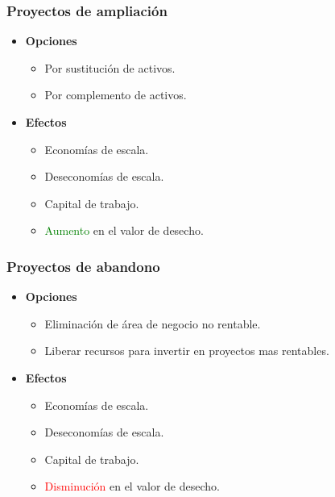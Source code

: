 \documentclass{templateNote}
\begin{document}
\subsubsection*{Proyectos de ampliación}

\begin{itemize}
    \item \textbf{Opciones}
    \begin{itemize}
        \item Por sustitución de activos.
        \item Por complemento de activos.
    \end{itemize}
    \item \textbf{Efectos}
    \begin{itemize}
        \item Economías de escala.
        \item Deseconomías de escala.
        \item Capital de trabajo.
        \item \textcolor{green}{Aumento} en el valor de desecho.
    \end{itemize}
\end{itemize}

\subsubsection*{Proyectos de abandono}

\begin{itemize}
\item \textbf{Opciones}
    \begin{itemize}
        \item Eliminación de área de negocio no rentable.
        \item Liberar recursos para invertir en proyectos mas rentables.
    \end{itemize}
    \item \textbf{Efectos}
    \begin{itemize}
        \item Economías de escala.
        \item Deseconomías de escala.
        \item Capital de trabajo.
        \item \textcolor{red}{Disminución} en el valor de desecho.
    \end{itemize}
\end{itemize}
\end{document}

